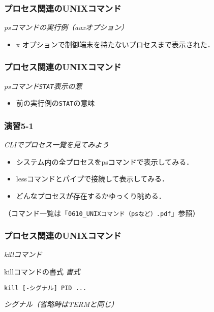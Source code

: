 \documentclass{beamer}                 %
\begin{document}
\begin{frame}[fragile]
  \frametitle{プロセス関連のUNIXコマンド}
  \emph{psコマンドの実行例（auxオプション）}

  \begin{itemize}
  \item x オプションで制御端末を持たないプロセスまで表示された．
  \end{itemize}
\end{frame}

\begin{frame}[fragile]
  \frametitle{プロセス関連のUNIXコマンド}
  \emph{psコマンド\texttt{STAT}表示の意}

  \begin{itemize}
  \item 前の実行例の\texttt{STAT}の意味
  \end{itemize}
\end{frame}

\begin{frame}[fragile]
  \frametitle{演習5-1}
  \emph{CLIでプロセス一覧を見てみよう}
\begin{itemize}
\item システム内の全プロセスをpsコマンドで表示してみる．
\item lessコマンドとパイプで接続して表示してみる．
\item どんなプロセスが存在するかゆっくり眺める． 
\end{itemize}
  （コマンド一覧は「\texttt{0610\_UNIXコマンド（psなど）.pdf}」参照）
\end{frame}

\begin{frame}[fragile]
  \frametitle{プロセス関連のUNIXコマンド}
  \emph{killコマンド}
  \begin{itembox}[l]{killコマンドの書式}
    \emph{書式}
    \begin{lstlisting}[frame=none]
    kill [-シグナル] PID ...
    \end{lstlisting}
    \emph{シグナル（省略時はTERMと同じ）}
  \end{itembox}
\end{frame}
\end{document}

